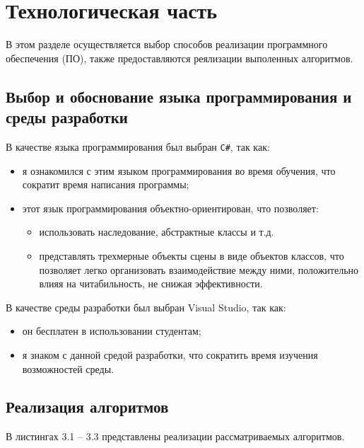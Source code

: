 \chapter{Технологическая часть}

В этом разделе осуществляется выбор способов реализации программного обеспечения (ПО), также предоставляются реялизации выполенных алгоритмов. 

\section{Выбор и обоснование языка программирования и среды разработки}

В качестве языка программирования был выбран \texttt{C\#}, так как:
\begin{itemize}
	\item я ознакомился с этим языком программирования во время обучения, что сократит время написания программы;
	\item этот язык программирования объектно-ориентирован, что позволяет:
	\begin{itemize}
		\item использовать наследование, абстрактные классы и т.д.
		\item представлять трехмерные объекты сцены в виде объектов классов, что позволяет легко организовать взаимодействие между ними, положительно влияя на читабильность, не снижая эффективности.
	\end{itemize}
\end{itemize}

В качестве среды разработки был выбран Visual Studio, так как:
\begin{itemize}
	\item он бесплатен в использовании студентам;
	\item я знаком с данной средой разработки, что сократить время изучения возможностей среды.
\end{itemize}
\clearpage

\section{Реализация алгоритмов}

В листингах 3.1 -- 3.3 представлены реализации рассматриваемых алгоритмов.

